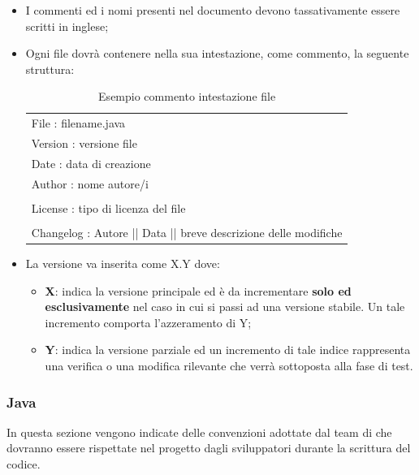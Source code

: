 \begin{itemize}
	\item I commenti ed i nomi presenti nel documento devono tassativamente essere scritti in inglese;
	\item Ogni file dovrà contenere nella sua intestazione, come commento, la seguente struttura:
\begin{table} [H]
	\begin{center}
		\begin{tabular}{| l |}
			\hline
			File : filename.java\\
			Version : versione file\\
			Date : data di creazione\\
			Author : nome autore/i\\
			\\
			License : tipo di licenza del file\\
			\\
			Changelog : Autore || Data || breve descrizione delle modifiche\\
			\hline
		\end{tabular}
	\end{center}
	\caption{Esempio commento intestazione file}
\end{table}
\end{itemize}

\begin{itemize}
	\item La versione va inserita come X.Y dove:
	\begin{itemize}
		\item \textbf{X}: indica la versione principale ed è da incrementare \textbf{solo ed esclusivamente} nel caso in cui si passi ad una versione stabile. Un tale incremento comporta l’azzeramento di Y;
		\item \textbf{Y}: indica la versione parziale ed un incremento di tale indice rappresenta una verifica o una modifica rilevante che verrà sottoposta alla fase di test.
	\end{itemize}
\end{itemize}
\subsubsection{Java}
In questa sezione vengono indicate delle convenzioni adottate dal team di 
\href{https://google.github.io/styleguide/javaguide.html} che dovranno essere rispettate nel progetto dagli sviluppatori durante la scrittura del codice.
